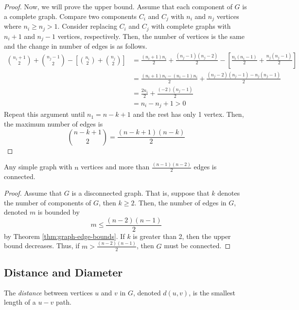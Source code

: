 \begin{proof}
  Now, we will prove the upper bound. Assume that each component of \(G\) is a
  complete graph. Compare two components \(C_i\) and \(C_j\) with \(n_i\) and
  \(n_j\) vertices where \(n_i \geq n_j > 1\). Consider replacing \(C_i\) and
  \(C_j\) with complete graphs with \(n_i + 1\) and \(n_j - 1\) vertices, 
  respectively. Then, the number of vertices is the same and the change in
  number of edges is as follows.
  \[
  \begin{aligned}
    \binom{n_i + 1}{2} + \binom{n_j - 1}{2} - \left[\binom{n_i}{2} + \binom{n_j}{2}\right]
      &= \frac{(n_i+1)n_i}{2} + \frac{(n_j-1)(n_j-2)}{2} 
        - \left[\frac{n_i(n_i-1)}{2} + \frac{n_j(n_j-1)}{2}\right] \\ 
      &= \frac{(n_i + 1)n_i - (n_i - 1)n_i}{2} +
        \frac{(n_j - 2)(n_j - 1) - n_j(n_j - 1)}{2} \\ 
      & = \frac{2n_i}{2} + \frac{(-2)(n_j-1)}{2} \\ 
      & = n_i - n_j + 1 > 0
  \end{aligned}
  \]
  Repeat this argument until \(n_1 = n-k+1\) and the rest has only 1 vertex.
  Then, the maximum number of edges is
  \[ \binom{n-k+1}{2} = \frac{(n-k+1)(n-k)}{2} \]
\end{proof}

\begin{corollary}
  Any simple graph with \(n\) vertices and more than \(\frac{(n-1)(n-2)}{2}\)
  edges is connected.
\end{corollary}

\begin{proof}
  Assume that \(G\) is a disconnected graph. That is, suppose that \(k\) denotes 
  the number of components of \(G\), then \(k \geq 2\). Then, the number of 
  edges in \(G\), denoted \(m\) is bounded by
  \[ m \leq \frac{(n-2)(n-1)}{2} \]
  by Theorem \ref{thm:graph-edge-bounds}. If \(k\) is greater than 2, then the 
  upper bound decreases. Thus, if \(m > \frac{(n-2)(n-1)}{2}\), then \(G\) must be connected.
\end{proof}

\subsection{Distance and Diameter}

\begin{definition}[Distance]
  The \textit{distance} between vertices \(u\) and \(v\) in \(G\), denoted
  \(d(u, v)\), is the smallest length of a \(u - v\) path.
\end{definition}

